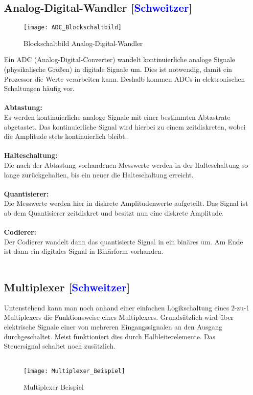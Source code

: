 \documentclass[titlepage,12pt,twoside]{article}
\begin{document}
\subsection{Analog-Digital-Wandler [\textcolor{blue}{Schweitzer}]}
\label{chap:Analog-Digital-Wandler}
\begin{figure}[H]
	\begin{center}
		\scalebox{1.2}
		{\texttt{[image: ADC\_Blockschaltbild]}}
		\caption{Blockschaltbild Analog-Digital-Wandler}
		\label{fig:ADC_Blockschaltbild}
	\end{center}
\end{figure}
\hfill \break
Ein ADC (Analog-Digital-Converter) wandelt kontinuierliche analoge Signale 
(physikalische Größen) in digitale Signale um. Dies ist notwendig, damit ein 
Prozessor die Werte verarbeiten kann. Deshalb kommen ADCs in elektronischen 
Schaltungen häufig vor. \\
\\
\textbf{Abtastung:} \\
Es werden kontinuierliche analoge Signale mit einer bestimmten 
Abtastrate abgetastet. Das kontinuierliche Signal wird hierbei zu einem 
zeitdiskreten, wobei die Amplitude stets kontinuierlich bleibt. \\
\\
\textbf{Halteschaltung:} \\
Die nach der Abtastung vorhandenen Messwerte werden in der Halteschaltung so 
lange zurückgehalten, bis ein neuer die Halteschaltung erreicht. \\
\\
\textbf{Quantisierer:} \\
Die Messwerte werden hier in diskrete Amplitudenwerte aufgeteilt. Das Signal 
ist ab dem Quantisierer zeitdiskret und besitzt nun eine diskrete Amplitude. \\
\\
\textbf{Codierer:} \\
Der Codierer wandelt dann das quantisierte Signal in ein binäres um. Am Ende ist 
dann ein digitales Signal in Binärform vorhanden. \\
\\

\subsection{Multiplexer [\textcolor{blue}{Schweitzer}]}
\label{chap:Multiplexer}
Untenstehend kann man noch anhand einer einfachen Logikschaltung eines 2-zu-1 
Multiplexers die Funktionsweise eines Multiplexers. Grundsätzlich wird über elektrische 
Signale einer von mehreren Eingangssignalen an den Ausgang durchgeschaltet. Meist 
funktioniert dies durch Halbleiterelemente. Das Steuersignal schaltet noch zusätzlich. \\
\\
\begin{figure}[H]
	\begin{center}
		\scalebox{1.0}
		{\texttt{[image: Multiplexer\_Beispiel]}}
		\caption{Multiplexer Beispiel}
		\label{fig:Multiplexer_Beispiel}
	\end{center}
\end{figure}
\hfill \break
\end{document}
